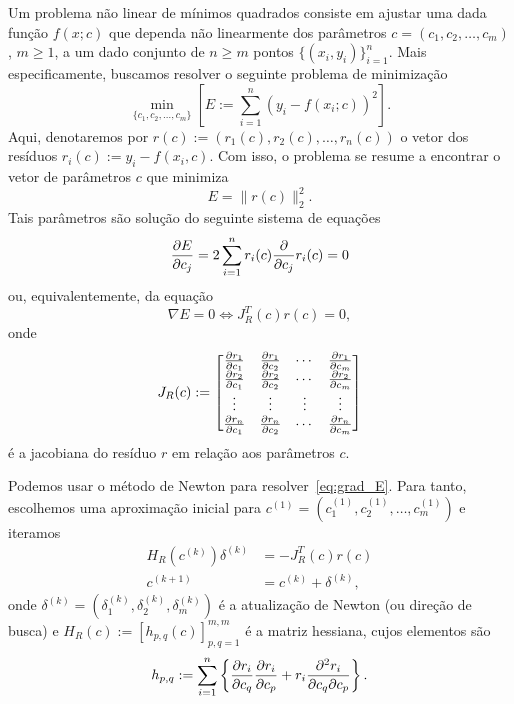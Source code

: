 Um problema não linear de mínimos quadrados consiste em ajustar uma dada função $f(x;c)$ que dependa não linearmente dos parâmetros $c = (c_1, c_2, \dotsc, c_m)$, $m\geq 1$, a um dado conjunto de $n\geq m$ pontos $\{(x_i, y_i)\}_{i=1}^n$. Mais especificamente, buscamos resolver o seguinte problema de minimização
\begin{equation}\label{eq:prob_nlin_mq}
  \min_{\{c_1, c_2, \dotsc, c_m\}} \left[E := \sum_{i=1}^n \left(y_i - f(x_i;c)\right)^2\right].
\end{equation}
Aqui, denotaremos por $r(c) := (r_1(c), r_2(c), \dotsc, r_n(c))$ o vetor dos resíduos $r_i(c) := y_i - f(x_i,c)$. Com isso, o problema se resume a encontrar o vetor de parâmetros $c$ que minimiza
\begin{equation}
  E = \|r(c)\|_2^2.
\end{equation}
Tais parâmetros são solução do seguinte sistema de equações
\begin{equation}
  \frac{\partial E}{\partial c_j} = 2\sum_{i=1}^n r_i(c)\frac{\partial}{\partial c_j}r_i(c) = 0
\end{equation}
ou, equivalentemente, da equação
\begin{equation}\label{eq:grad_E}
  \nabla E = 0 \Leftrightarrow J_R^T(c)r(c) = 0,
\end{equation}
onde
\begin{equation}
  J_R(c) :=
  \begin{bmatrix}
    \frac{\partial r_1}{\partial c_1} & \frac{\partial r_1}{\partial c_2} & \cdots & \frac{\partial r_1}{\partial c_m}\\
    \frac{\partial r_2}{\partial c_1} & \frac{\partial r_2}{\partial c_2} & \cdots & \frac{\partial r_2}{\partial c_m}\\
    \vdots  & \vdots & \vdots & \vdots \\
    \frac{\partial r_n}{\partial c_1} & \frac{\partial r_n}{\partial c_2} & \cdots & \frac{\partial r_n}{\partial c_m}
  \end{bmatrix}
\end{equation}
é a jacobiana do resíduo $r$ em relação aos parâmetros $c$.

Podemos usar o método de Newton para resolver~\eqref{eq:grad_E}. Para tanto, escolhemos uma aproximação inicial para $c^{(1)} = (c_1^{(1)}, c_2^{(1)}, \dotsc, c_m^{(1)})$ e iteramos
\begin{align}
  H_R(c^{(k)})\delta^{(k)} &= -J_R^T(c)r(c) \label{eq:mqnl_newton1}\\
  c^{(k+1)} &= c^{(k)} + \delta^{(k)} \label{eq:mqnl_newton2},
\end{align}
onde $\delta^{(k)} = (\delta_1^{(k)}, \delta_2^{(k)}, \delta_m^{(k)})$ é a atualização de Newton (ou direção de busca) e $H_R(c) := [h_{p,q}(c)]_{p,q=1}^{m,m}$ é a matriz hessiana, cujos elementos são
\begin{equation}
  h_{p,q} := \sum_{i=1}^n\left\{\frac{\partial r_i}{\partial c_q}\frac{\partial r_i}{\partial c_p} + r_i\frac{\partial^2 r_i}{\partial c_q\partial c_p}\right\}.
\end{equation}

